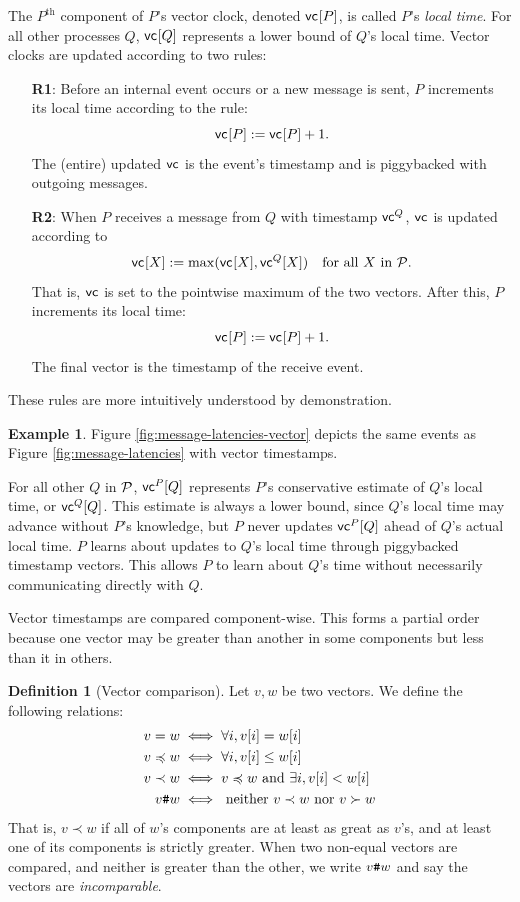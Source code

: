 \documentclass[]             %
{NASA}                       %
\theoremstyle{definition}
\newtheorem{example}[theorem]{Example}
\newtheorem{definition}[theorem]{Definition}
\begin{document}
The $P^\textrm{th}$ component of $P$'s vector clock, denoted
$\mathsf{vc}^{}[P]$, is called $P$'s \emph{local time}. For all other processes
$Q$, $\mathsf{vc}^{}[Q]$ represents a lower bound of $Q$'s local time. Vector
clocks are updated according to two rules:
\begin{enumerate}
\item[\textbf{R1}:] Before an internal event occurs or a new message is sent, $P$
  increments its local time according to the rule:
  \[\mathsf{vc}^{}[P] := \mathsf{vc}^{}[P] + 1.\]
  The (entire) updated $\mathsf{vc}^{}$ is the event's timestamp and is piggybacked with outgoing messages.
\item[\textbf{R2}:] When $P$ receives a message from $Q$ with timestamp
  $\mathsf{vc}^{Q}$, $\mathsf{vc}^{}$ is updated according to
  \[\mathsf{vc}^{}[X] := \max(\mathsf{vc}^{}[X], \mathsf{vc}^{Q}[X]) \quad \textrm{for all $X$ in $\mathcal{P}$}.\]
  That is, $\mathsf{vc}^{}$ is set to the pointwise maximum of the two
  vectors. After this, $P$ increments its local time:
  \[ \mathsf{vc}^{}[P] := \mathsf{vc}^{}[P] + 1.\]
  The final vector is the timestamp of the receive event.
\end{enumerate}
These rules are more intuitively understood by demonstration.

\begin{example}
  Figure \ref{fig:message-latencies-vector} depicts the same events as
  Figure \ref{fig:message-latencies} with vector timestamps.
\end{example}

For all other $Q$ in $\mathcal{P}$, $\mathsf{vc}^{P}[Q]$ represents $P$'s
conservative estimate of $Q$'s local time, or $\mathsf{vc}^{Q}[Q]$. This
estimate is always a lower bound, since $Q$'s local time may advance
without $P$'s knowledge, but $P$ never updates $\mathsf{vc}^{P}[Q]$ ahead of
$Q$'s actual local time. $P$ learns about updates to $Q$'s local time
through piggybacked timestamp vectors. This allows $P$ to learn about
$Q$'s time without necessarily communicating directly with $Q$.

Vector timestamps are compared component-wise. This forms a partial
order because one vector may be greater than another in some
components but less than it in others.

\begin{definition}[Vector comparison]
  Let $v, w$ be two vectors. We define the following relations:
  \begin{align*}
             v = w &\iff \forall i, v[i] = w[i] \\
  v \preccurlyeq w &\iff \forall i, v[i] \leq w[i] \\
         v \prec w &\iff v \preccurlyeq w \textrm{ and } \exists i, v[i] < w[i] \\
            v {\textrm{\texttt{\#}}} w &\iff \textrm{ neither } v \prec w \textrm{ nor } v \succ w
  \end{align*}
  That is, $v \prec w$ if all of $w$'s components are at least as
  great as $v$'s, and at least one of its components is strictly
  greater. When two non-equal vectors are compared, and neither is
  greater than the other, we write $v {\textrm{\texttt{\#}}} w$ and say the vectors
  are \emph{incomparable}.
\end{definition}
\end{document}
